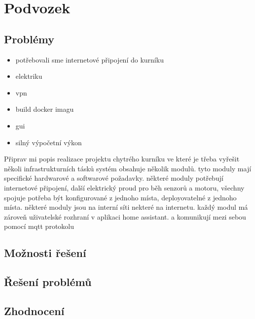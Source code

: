 \section{Podvozek}\label{sec:podvozek}
\subsection{Problémy}\label{subsec:podvozek-problemy}
\begin{itemize}
    \item potřebovali sme internetové připojení do kurníku
    \item elektriku
    \item vpn
    \item build docker imagu
    \item gui
    \item silný výpočetní výkon
\end{itemize}
Připrav mi popis realizace projektu chytrého kurníku ve které je třeba vyřešit několi infrastrukturních tásků
systém obsahuje několik modulů.
tyto moduly mají specifické hardwarové a softwarové požadavky.
některé moduly potřebují internetové připojení, další elektrický proud pro běh senzorů a motoru, všechny spojuje potřeba být konfigurované z jednoho místa, deployovatelné z jednoho místa.
některé moduly jsou na interní síti nekteré na internetu.
každý modul má zároveň uživatelské rozhraní v aplikaci home assistant.
a komunikují mezi sebou pomocí mqtt protokolu

\subsection{Možnosti řešení}\label{subsec:podvozek-moznosti-reseni}
\subsection{Řešení problémů}\label{subsec:podvozek-reseni-problemu}
\subsection{Zhodnocení}\label{subsec:podvozek-zhodnoceni}